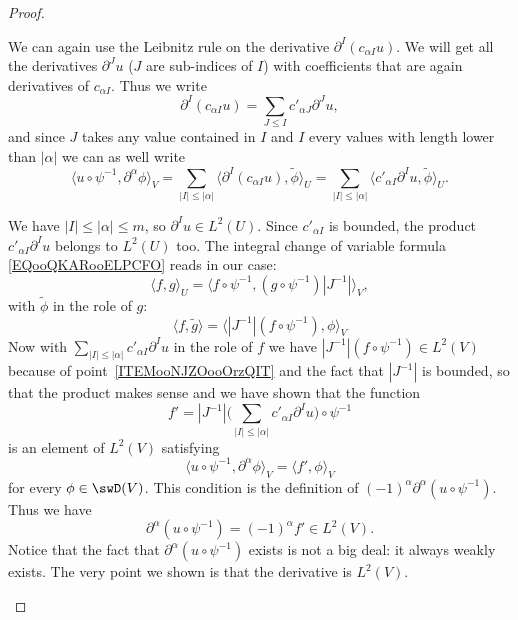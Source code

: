 \begin{proof}
\begin{subproof}
		We can again use the Leibnitz rule on the derivative \( \partial^{I}(c_{\alpha I} u)\). We will get all the derivatives \( \partial^Ju\) (\( J\) are sub-indices of \( I\)) with coefficients that are again derivatives of \( c_{\alpha I}\). Thus we write
		\begin{equation}
			\partial^I(c_{\alpha I}u)=\sum_{J\leq I}c'_{\alpha J}\partial^Ju,
		\end{equation}
		and since \( J\) takes any value contained in \( I\) and \( I\) every values with length lower than \( | \alpha |\) we can as well write
		\begin{equation}
			\langle u\circ\psi^{-1}, \partial^{\alpha}\phi\rangle_V =  \sum_{| I |\leq | \alpha |}\langle \partial^{I}(c_{\alpha I}u), \tilde \phi\rangle_U =\sum_{| I |\leq | \alpha |}\langle c'_{\alpha I}\partial^Iu, \tilde \phi\rangle_U.
		\end{equation}

		We have \( | I |\leq | \alpha |\leq m\), so \( \partial^Iu\in L^2(U)\). Since \( c'_{\alpha I}\) is bounded, the product \( c'_{\alpha I}\partial^Iu\) belongs to \( L^2(U)\) too. The integral change of variable formula \eqref{EQooQKARooELPCFO} reads in our case:
		\begin{equation}
			\langle f, g\rangle_U=\langle f\circ \psi^{-1}, (g\circ\psi^{-1})| J^{-1} |\rangle_V,
		\end{equation}
		with \( \tilde \phi\) in the role of \( g\):
		\begin{equation}
			\langle f, \tilde g\rangle =\langle | J^{-1} |(f\circ\psi^{-1}), \phi\rangle_V
		\end{equation}
		Now with \( \sum_{| I |\leq | \alpha |}c'_{\alpha I}\partial^Iu\) in the role of \( f\) we have \( | J^{-1} |(f\circ\psi^{-1})\in L^2(V)\) because of point~\ref{ITEMooNJZOooOrzQIT} and the fact that \( | J^{-1} |\) is bounded, so that the product makes sense and we have shown that the function
		\begin{equation}
			f'=| J^{-1} |\big( \sum_{| I |\leq | \alpha |}c'_{\alpha I}\partial^Iu \big)\circ\psi^{-1}
		\end{equation}
		is an element of \( L^2(V)\) satisfying
		\begin{equation}
			\langle u\circ\psi^{-1}, \partial^{\alpha}\phi\rangle_V =   \langle f', \phi\rangle_V
		\end{equation}
		for every \( \phi\in\swD(V)\). This condition is the definition of \(   (-1)^{\alpha} \partial^{\alpha}(u\circ\psi^{-1})\). Thus we have
		\begin{equation}
			\partial^{\alpha}(u\circ\psi^{-1})=(-1)^{\alpha}f'\in L^2(V).
		\end{equation}
		Notice that the fact that \( \partial^{\alpha}(u\circ\psi^{-1})\) exists is not a big deal: it always weakly exists. The very point we shown is that the derivative is \( L^2(V)\).


\end{subproof}
\end{proof}
